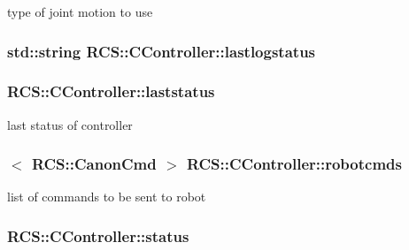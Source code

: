 type of joint motion to use \hypertarget{structRCS_1_1CController_a8bd2705747d1e16f5806ddf183bfade7}{
\subsubsection[{lastlogstatus}]{\setlength{\rightskip}{0pt plus 5cm}std\-::string R\-C\-S\-::\-C\-Controller\-::lastlogstatus}}\label{structRCS_1_1CController_a8bd2705747d1e16f5806ddf183bfade7}
\hypertarget{structRCS_1_1CController_af76ac9412dbefbaebc970d62f88a40fa}{
\subsubsection[{laststatus}]{ R\-C\-S\-::\-C\-Controller\-::laststatus\hspace{0.3cm}{\ttfamily [static]}}}\label{structRCS_1_1CController_af76ac9412dbefbaebc970d62f88a40fa}
last status of controller \hypertarget{structRCS_1_1CController_aa96c7961737b7e1cf5d8b4180f4bc399}{
\subsubsection[{robotcmds}]{$<$ {\bf R\-C\-S\-::\-Canon\-Cmd} $>$ R\-C\-S\-::\-C\-Controller\-::robotcmds\hspace{0.3cm}{\ttfamily [static]}}}\label{structRCS_1_1CController_aa96c7961737b7e1cf5d8b4180f4bc399}
list of commands to be sent to robot \hypertarget{structRCS_1_1CController_a82e9cc233cd25554964efe8a9008e0b2}{
\subsubsection[{status}]{ R\-C\-S\-::\-C\-Controller\-::status\hspace{0.3cm}{\ttfamily [static]}}}\label{structRCS_1_1CController_a82e9cc233cd25554964efe8a9008e0b2}
